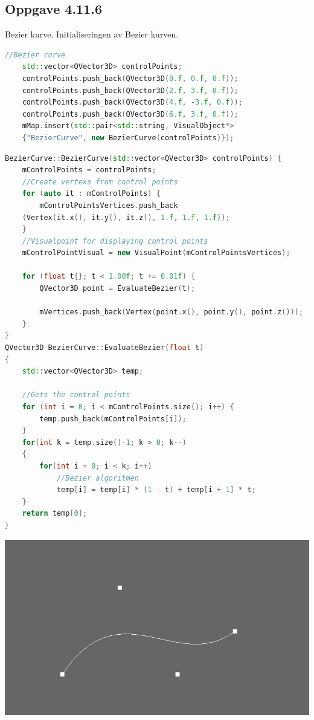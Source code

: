 \documentclass[a4paper,norsk]{article}
\begin{document}
\subsection{Oppgave 4.11.6}
Bezier kurve.
\newline
Initialiseringen av Bezier kurven.
\begin{lstlisting}[language=C++, caption={renderwindow.cpp}]
//Bezier curve
    std::vector<QVector3D> controlPoints;
    controlPoints.push_back(QVector3D(0.f, 0.f, 0.f));
    controlPoints.push_back(QVector3D(2.f, 3.f, 0.f));
    controlPoints.push_back(QVector3D(4.f, -3.f, 0.f));
    controlPoints.push_back(QVector3D(6.f, 3.f, 0.f));
    mMap.insert(std::pair<std::string, VisualObject*>
	{"BezierCurve", new BezierCurve(controlPoints)});
\end{lstlisting}
\begin{lstlisting}[language=C++, caption={beziercurve.cpp}]
BezierCurve::BezierCurve(std::vector<QVector3D> controlPoints) {
    mControlPoints = controlPoints;
    //Create vertexs from control points
    for (auto it : mControlPoints) {
        mControlPointsVertices.push_back
	(Vertex(it.x(), it.y(), it.z(), 1.f, 1.f, 1.f));
    }
    //Visualpoint for displaying control points
    mControlPointVisual = new VisualPoint(mControlPointsVertices);

    for (float t{}; t < 1.00f; t += 0.01f) {
        QVector3D point = EvaluateBezier(t);

        mVertices.push_back(Vertex(point.x(), point.y(), point.z()));
    }
}
QVector3D BezierCurve::EvaluateBezier(float t)
{
    std::vector<QVector3D> temp;

    //Gets the control points
    for (int i = 0; i < mControlPoints.size(); i++) {
        temp.push_back(mControlPoints[i]);
    }
    for(int k = temp.size()-1; k > 0; k--)
    {
        for(int i = 0; i < k; i++) 
            //Bezier algoritmen
            temp[i] = temp[i] * (1 - t) + temp[i + 1] * t;
    }
    return temp[0];
}
\end{lstlisting}
\centering
\includegraphics[width=\textwidth]{MatteOblig2BezierCurveImage}
\end{document}
